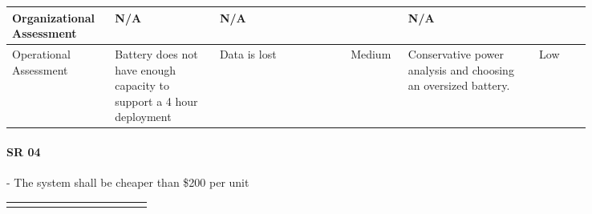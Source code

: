 \begin{landscape}
{\begin{longtable}{| p{0.12\linewidth} | p{0.16\linewidth} |  p{0.20\linewidth} | p{0.08\linewidth} | p{0.20\linewidth} | p{0.08\linewidth} |}
	\hline
	Organizational \newline Assessment & N/A & N/A & \cellcolor[gray]{0.8} & N/A & \cellcolor[gray]{0.8} \\
	\hline
	Operational \newline Assessment & Battery does not have enough capacity to support a 4 hour deployment & Data is lost & \cellcolor{yellow} Medium & Conservative power analysis and choosing an oversized battery. & \cellcolor{green} Low
	\label{tab:sr03_feasibility}
\end{longtable}
}
\newpage



\paragraph*{SR 04} - The system shall be cheaper than \$200 per unit

{\fontsize{8pt}{8pt}\selectfont
\begin{longtable}{| p{0.12\linewidth} | p{0.16\linewidth} |  p{0.20\linewidth} | p{0.08\linewidth} | p{0.20\linewidth} | p{0.08\linewidth} |}
	\hline \endlastfoot


\end{longtable}}
\end{landscape}
